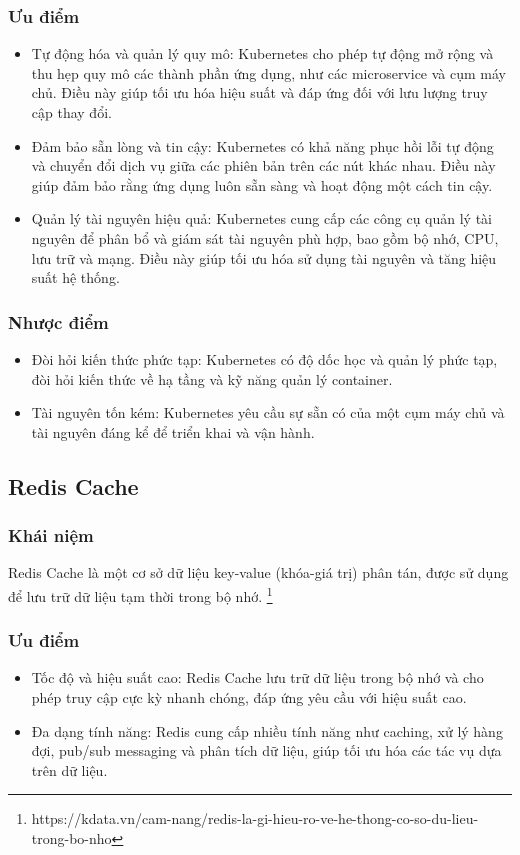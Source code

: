 \subsubsection{Ưu điểm}
\begin{itemize}
    \item Tự động hóa và quản lý quy mô: Kubernetes cho phép tự động mở rộng và thu hẹp quy mô các thành phần ứng dụng, như các microservice và cụm máy chủ. Điều này giúp tối ưu hóa hiệu suất và đáp ứng đối với lưu lượng truy cập thay đổi.

    \item Đảm bảo sẵn lòng và tin cậy: Kubernetes có khả năng phục hồi lỗi tự động và chuyển đổi dịch vụ giữa các phiên bản trên các nút khác nhau. Điều này giúp đảm bảo rằng ứng dụng luôn sẵn sàng và hoạt động một cách tin cậy.

    \item Quản lý tài nguyên hiệu quả: Kubernetes cung cấp các công cụ quản lý tài nguyên để phân bổ và giám sát tài nguyên phù hợp, bao gồm bộ nhớ, CPU, lưu trữ và mạng. Điều này giúp tối ưu hóa sử dụng tài nguyên và tăng hiệu suất hệ thống.

\end{itemize}
\subsubsection{Nhược điểm}
\begin{itemize}
    \item Đòi hỏi kiến thức phức tạp: Kubernetes có độ dốc học và quản lý phức tạp, đòi hỏi kiến thức về hạ tầng và kỹ năng quản lý container.
    \item Tài nguyên tốn kém: Kubernetes yêu cầu sự sẵn có của một cụm máy chủ và tài nguyên đáng kể để triển khai và vận hành.
\end{itemize}
\subsection{Redis Cache}
\subsubsection{Khái niệm}
\indent Redis Cache là một cơ sở dữ liệu key-value (khóa-giá trị) phân tán, được sử dụng để lưu trữ dữ liệu tạm thời trong bộ nhớ. \footnote{https://kdata.vn/cam-nang/redis-la-gi-hieu-ro-ve-he-thong-co-so-du-lieu-trong-bo-nho}
\subsubsection{Ưu điểm}
\begin{itemize}
    \item Tốc độ và hiệu suất cao: Redis Cache lưu trữ dữ liệu trong bộ nhớ và cho phép truy cập cực kỳ nhanh chóng, đáp ứng yêu cầu với hiệu suất cao.
    \item Đa dạng tính năng: Redis cung cấp nhiều tính năng như caching, xử lý hàng đợi, pub/sub messaging và phân tích dữ liệu, giúp tối ưu hóa các tác vụ dựa trên dữ liệu.
\end{itemize}
